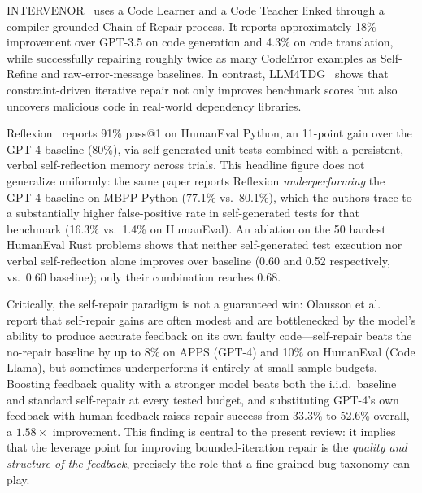 \documentclass[10pt,a4paper]{article}
\begin{document}
INTERVENOR~\cite{wang2024intervenor} uses a Code Learner and a Code Teacher linked through a compiler-grounded Chain-of-Repair process. It reports approximately 18\% improvement over GPT-3.5 on code generation and 4.3\% on code translation, while successfully repairing roughly twice as many CodeError examples as Self-Refine and raw-error-message baselines. In contrast, LLM4TDG~\cite{liu2025llm4tdg} shows that constraint-driven iterative repair not only improves benchmark scores but also uncovers malicious code in real-world dependency libraries.

Reflexion~\cite{shinn2023} reports 91\% pass@1 on HumanEval Python, an 11-point gain over the GPT-4 baseline (80\%), via self-generated unit tests combined with a persistent, verbal self-reflection memory across trials. This headline figure does not generalize uniformly: the same paper reports Reflexion \emph{underperforming} the GPT-4 baseline on MBPP Python (77.1\% vs.\ 80.1\%), which the authors trace to a substantially higher false-positive rate in self-generated tests for that benchmark (16.3\% vs.\ 1.4\% on HumanEval). An ablation on the 50 hardest HumanEval Rust problems shows that neither self-generated test execution nor verbal self-reflection alone improves over baseline (0.60 and 0.52 respectively, vs.\ 0.60 baseline); only their combination reaches 0.68.

Critically, the self-repair paradigm is not a guaranteed win: Olausson et al.~\cite{olausson2024} report that self-repair gains are often modest and are bottlenecked by the model's ability to produce accurate feedback on its own faulty code---self-repair beats the no-repair baseline by up to 8\% on APPS (GPT-4) and 10\% on HumanEval (Code Llama), but sometimes underperforms it entirely at small sample budgets. Boosting feedback quality with a stronger model beats both the i.i.d.\ baseline and standard self-repair at every tested budget, and substituting GPT-4's own feedback with human feedback raises repair success from 33.3\% to 52.6\% overall, a $1.58\times$ improvement. This finding is central to the present review: it implies that the leverage point for improving bounded-iteration repair is the \textit{quality and structure of the feedback}, precisely the role that a fine-grained bug taxonomy can play.
\end{document}
